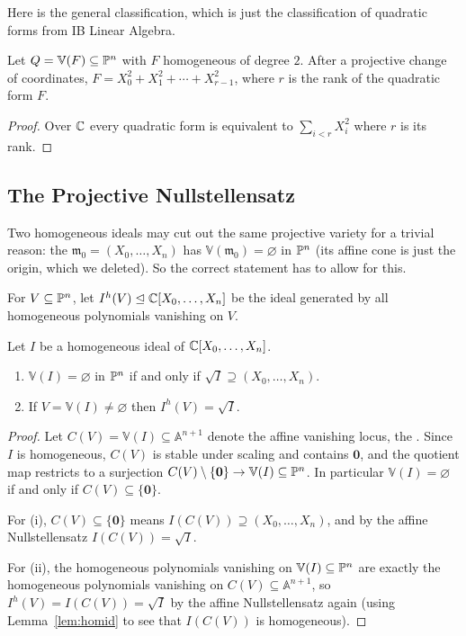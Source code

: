\documentclass[a4paper]{scrartcl}
\newcommand{\A}{\mathbb{A}}
\newcommand{\V}{\mathbb{V}}
\newcommand{\mm}{\mathfrak{m}}
\begin{document}
Here is the general classification, which is just the classification of quadratic forms from IB Linear Algebra.

\begin{theorem}
	Let $Q = \V(F) \subseteq \PP^n$ with $F$ homogeneous of degree $2$. After a projective change of coordinates, $F = X_0^2 + X_1^2 + \cdots + X_{r-1}^2$, where $r$ is the rank of the quadratic form $F$.
\end{theorem}

\begin{proof}
	Over $\mathbb{C}$ every quadratic form is equivalent to $\sum_{i<r} X_i^2$ where $r$ is its rank.
\end{proof}

\subsection{The Projective Nullstellensatz}

Two homogeneous ideals may cut out the same projective variety for a trivial reason: the  $\mm_0 = (X_0,\dots,X_n)$ has $\V(\mm_0) = \varnothing$ in $\mathbb{P}^n$ (its affine cone is just the origin, which we deleted). So the correct statement has to allow for this.

\begin{definition}
	For $V \subseteq \mathbb{P}^n$, let $I^h(V) \trianglelefteq \mathbb{C}[X_0,\dots,X_n]$ be the ideal generated by all homogeneous polynomials vanishing on $V$.
\end{definition}

\begin{theorem}
	Let $I$ be a homogeneous ideal of $\mathbb{C}[X_0,\dots,X_n]$.
	\begin{enumerate}[label=(\roman*)]
		\item $\V(I) = \varnothing$ in $\mathbb{P}^n$ if and only if $\sqrt I \supseteq (X_0,\dots,X_n)$.
		\item If $V = \V(I) \neq \varnothing$ then $I^h(V) = \sqrt I$.
	\end{enumerate}
\end{theorem}

\begin{proof}
	Let $C(V) = \V(I) \subseteq \A^{n+1}$ denote the affine vanishing locus, the . Since $I$ is homogeneous, $C(V)$ is stable under scaling and contains $\mathbf 0$, and the quotient map restricts to a surjection $C(V)\setminus\{\mathbf 0\} \to \V(I) \subseteq \PP^n$. In particular $\V(I) = \varnothing$ if and only if $C(V) \subseteq \{\mathbf 0\}$.

	For (i), $C(V) \subseteq \{\mathbf 0\}$ means $I(C(V)) \supseteq (X_0,\dots,X_n)$, and by the affine Nullstellensatz $I(C(V)) = \sqrt I$.

	For (ii), the homogeneous polynomials vanishing on $\V(I) \subseteq \PP^n$ are exactly the homogeneous polynomials vanishing on $C(V) \subseteq \A^{n+1}$, so $I^h(V) = I(C(V)) = \sqrt I$ by the affine Nullstellensatz again (using Lemma~\ref{lem:homid} to see that $I(C(V))$ is homogeneous).
\end{proof}
\end{document}
